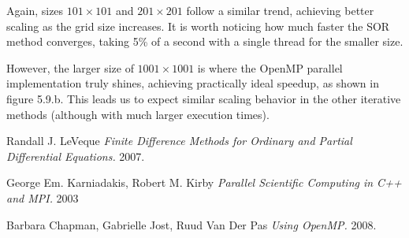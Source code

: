 \documentclass[11pt]{report}
\begin{document}
\newpage

Again, sizes $101 \times 101$ and $201 \times 201$ follow a similar trend, achieving better scaling as the grid size increases. It is worth noticing how much faster the SOR method converges, taking 5\% of a second with a single thread for the smaller size.
\newline

However, the larger size of $1001 \times 1001$ is where the OpenMP parallel implementation truly shines, achieving practically ideal speedup, as shown in figure 5.9.b. This leads us to expect similar scaling behavior in the other iterative methods (although with much larger execution times).
\newline




\begin{thebibliography}{1}

   Randall J. LeVeque {\em Finite Difference Methods for Ordinary and Partial Differential Equations.}  2007.

   George Em. Karniadakis, Robert M. Kirby {\em Parallel Scientific Computing in C++ and MPI.} 2003 

   Barbara Chapman, Gabrielle Jost, Ruud Van Der Pas {\em Using OpenMP.} 2008.

  \end{thebibliography}
\end{document}
